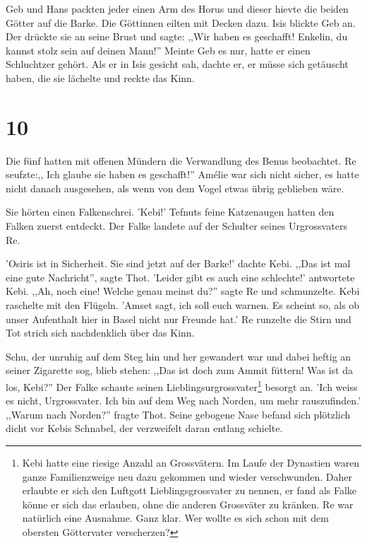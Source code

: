 \documentclass[11pt,titlepage,a5paper]{book}
\begin{document}
Geb und Hans packten jeder einen Arm des Horus und dieser hievte die beiden Götter auf die Barke. Die Göttinnen eilten mit Decken dazu. Isis blickte Geb an. Der drückte sie an seine Brust und sagte: ,,Wir haben es geschafft! Enkelin, du kannst stolz sein auf deinen Mann!'' Meinte Geb es nur, hatte er einen Schluchtzer gehört. Als er in Isis gesicht sah, dachte er, er müsse sich getäuscht haben, die sie lächelte und reckte das Kinn.

\section*{10}

Die fünf hatten mit offenen Mündern die Verwandlung des Benus beobachtet. Re seufzte:,, Ich glaube sie haben es geschafft!'' Amélie war sich nicht sicher, es hatte nicht danach ausgesehen, als wenn von dem Vogel etwas übrig geblieben wäre.

Sie hörten einen Falkenschrei. 'Kebi!' Tefnuts feine Katzenaugen hatten den Falken zuerst entdeckt. Der Falke landete auf der Schulter seines Urgrossvaters Re. 

'Osiris ist in Sicherheit. Sie sind jetzt auf der Barke!' dachte Kebi. ,,Das ist mal eine gute Nachricht'', sagte Thot. 'Leider gibt es auch eine schlechte!' antwortete Kebi. ,,Ah, noch eine! Welche genau meinst du?'' sagte Re und schmunzelte. Kebi raschelte mit den Flügeln. 'Amset sagt, ich soll euch warnen. Es scheint so, als ob unser Aufenthalt hier in Basel nicht nur Freunde hat.' Re runzelte die Stirn und Tot strich sich nachdenklich über das Kinn. 

Schu, der unruhig auf dem Steg hin und her gewandert war und dabei heftig an seiner Zigarette sog, blieb stehen: ,,Das ist doch zum Ammit füttern! Was ist da los, Kebi?'' Der Falke schaute seinen Lieblingsurgrossvater\footnote{Kebi hatte eine riesige Anzahl an Grossvätern. Im Laufe der Dynastien waren ganze Familienzweige neu dazu gekommen und wieder verschwunden. Daher erlaubte er sich den Luftgott Lieblingsgrossvater zu nennen, er fand als Falke könne er sich das erlauben, ohne die anderen Grossväter zu kränken. Re war natürlich eine Ausnahme. Ganz klar. Wer wollte es sich schon mit dem obersten Göttervater verscherzen?}  besorgt an. 'Ich weiss es nicht, Urgrossvater. Ich bin auf dem Weg nach Norden, um mehr rauszufinden.' ,,Warum nach Norden?'' fragte Thot. Seine gebogene Nase befand sich plötzlich dicht vor Kebis Schnabel, der verzweifelt daran entlang schielte. 
\end{document}
